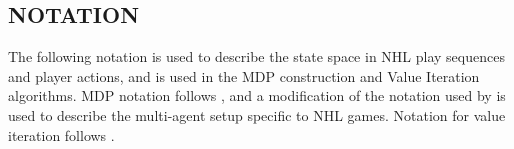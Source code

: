 \documentclass[]{article}
\begin{document}

\subsection{NOTATION}

The following notation is used to describe the state space in NHL play sequences and player actions, and is used in the MDP construction and Value Iteration algorithms. MDP notation follows \citep{Russell2010}, and a modification of the notation used by \citep{Littman1994} is used to describe the multi-agent setup specific to NHL games. Notation for value iteration follows \citep{Mitchell1997}.
\end{document}
